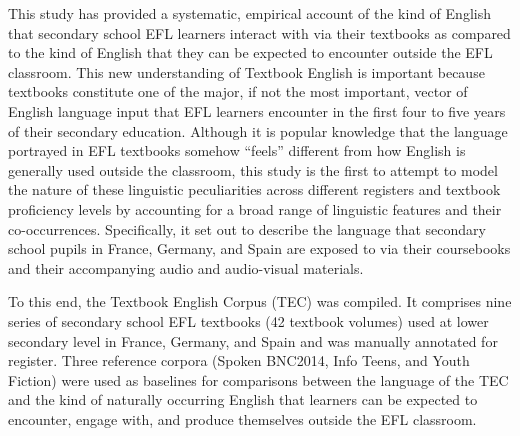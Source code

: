 \documentclass[
  letterpaper,
  DIV=11,
  numbers=noendperiod]{scrreprt}
\begin{document}
This study has provided a systematic, empirical account of the kind of
English that secondary school EFL learners interact with via their
textbooks as compared to the kind of English that they can be expected
to encounter outside the EFL classroom. This new understanding of
Textbook English is important because textbooks constitute one of the
major, if not the most important, vector of English language input that
EFL learners encounter in the first four to five years of their
secondary education. Although it is popular knowledge that the language
portrayed in EFL textbooks somehow ``feels'' different from how English
is generally used outside the classroom, this study is the first to
attempt to model the nature of these linguistic peculiarities across
different registers and textbook proficiency levels by accounting for a
broad range of linguistic features and their co-occurrences.
Specifically, it set out to describe the language that secondary school
pupils in France, Germany, and Spain are exposed to via their
coursebooks and their accompanying audio and audio-visual materials.

To this end, the Textbook English Corpus (TEC) was compiled. It
comprises nine series of secondary school EFL textbooks (42 textbook
volumes) used at lower secondary level in France, Germany, and Spain and
was manually annotated for register. Three reference corpora (Spoken
BNC2014, Info Teens, and Youth Fiction) were used as baselines for
comparisons between the language of the TEC and the kind of naturally
occurring English that learners can be expected to encounter, engage
with, and produce themselves outside the EFL classroom.
\end{document}
